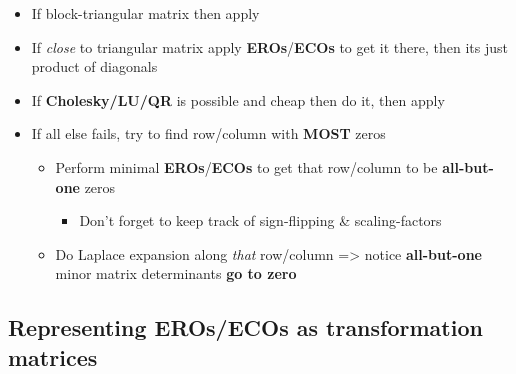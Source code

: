 \begin{itemize}

\item
  If block-triangular matrix then apply
\item
  If \emph{close} to triangular matrix apply \textbf{EROs}/\textbf{ECOs}
  to get it there, then its just product of diagonals
\item
  If \textbf{Cholesky/LU/QR} is possible and cheap then do it, then
  apply 
\item
  If all else fails, try to find row/column with \textbf{MOST} zeros

  \begin{itemize}
  
  \item
    Perform minimal \textbf{EROs}/\textbf{ECOs} to get that row/column
    to be \textbf{all-but-one} zeros

    \begin{itemize}
    
    \item
      Don't forget to keep track of sign-flipping \& scaling-factors
    \end{itemize}
  \item
    Do Laplace expansion along \emph{that} row/column =\textgreater{}
    notice \textbf{all-but-one} minor matrix determinants \textbf{go to
    zero}
  \end{itemize}
\end{itemize}

\subsection*{Representing EROs/ECOs as transformation
matrices}

